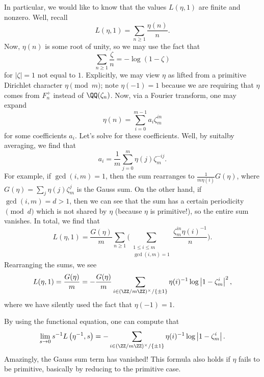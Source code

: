 \documentclass{article}
\begin{document}
In particular, we would like to know that the values $L(\eta,1)$ are finite and nonzero. Well, recall
\[L(\eta,1)=\sum_{n\ge1}\frac{\eta(n)}n.\]
Now, $\eta(n)$ is some root of unity, so we may use the fact that
\[\sum_{n\ge1}\frac{\zeta}n=-\log(1-\zeta)\]
for $\left|\zeta\right|=1$ not equal to $1$. Explicitly, we may view $\eta$ as lifted from a primitive Dirichlet character $\eta\pmod m$; note $\eta(-1)=1$ because we are requiring that $\eta$ comes from $F_n^+$ instead of $\QQ(\zeta_n)$. Now, via a Fourier transform, one may expand
\[\eta(n)=\sum_{i=0}^{m-1}a_i\zeta_m^{in}\]
for some coefficients $a_i$. Let's solve for these coefficients. Well, by suitalby averaging, we find that
\[a_i=\frac1m\sum_{j=0}^m\eta(j)\zeta_m^{-ij}.\]
For example, if $\gcd(i,m)=1$, then the sum rearranges to $\frac1{m\eta(i)}G(\eta)$, where $G(\eta)=\sum_j\eta(j)\zeta_m^j$ is the Gauss sum. On the other hand, if $\gcd(i,m)=d>1$, then we can see that the sum has a certain periodicity$\pmod d$ which is not shared by $\eta$ (because $\eta$ is primitive!), so the entire sum vanishes. In total, we find that
\[L(\eta,1)=\frac{G(\eta)}m\sum_{n\ge1}\Bigg(\sum_{\substack{1\le i\le m\\\gcd(i,m)=1}}\frac{\zeta_m^{in}\eta(i)^{-1}}n\Bigg).\]
Rearranging the sums, we see
\[L(\eta,1)=\frac{G(\eta)}m=-\frac{G(\eta)}m\sum_{i\in(\ZZ/m\ZZ)^\times/\{\pm1\}}\eta(i)^{-1}\log\left|1-\zeta_m^i\right|^2,\]
where we have silently used the fact that $\eta(-1)=1$.
\begin{remark}
	By using the functional equation, one can compute that
	\[\lim_{s\to0}s^{-1}L\left(\eta^{-1},s\right)=-\sum_{i\in(\ZZ/m\ZZ)^\times/\{\pm1\}}\eta(i)^{-1}\log\left|1-\zeta_m^i\right|.\]
	Amazingly, the Gauss sum term has vanished! This formula also holds if $\eta$ fails to be primitive, basically by reducing to the primitive case.
\end{remark}
\end{document}

